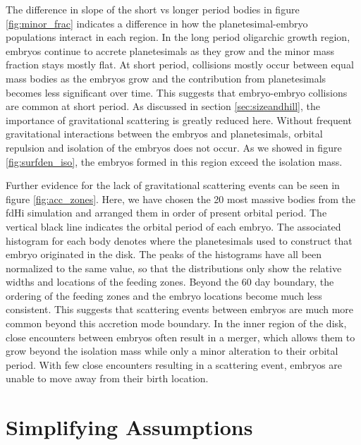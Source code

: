 \documentclass[twocolumn]{aastex63}
\begin{document}
The difference in slope of the short vs longer period bodies in figure \ref{fig:minor_frac} indicates a difference in how the planetesimal-embryo populations interact in each region. In the long period oligarchic growth region, embryos continue to accrete planetesimals as they grow and the minor mass fraction stays mostly flat. At short period, collisions mostly occur between equal mass bodies as the embryos grow and the contribution from planetesimals becomes less significant over time. This suggests that embryo-embryo collisions are common at short period. As discussed in section \ref{sec:sizeandhill}, the importance of gravitational scattering is greatly reduced here. Without frequent gravitational interactions between the embryos and planetesimals, orbital repulsion \citep{kokubo98} and isolation of the embryos does not occur. As we showed in figure \ref{fig:surfden_iso}, the embryos formed in this region exceed the isolation mass.

Further evidence for the lack of gravitational scattering events can be seen in figure \ref{fig:acc_zones}. Here, we have chosen the 20 most massive bodies from the fdHi simulation and arranged them in order of present orbital period. The vertical black line indicates the orbital period of each embryo. The associated histogram for each body denotes where the planetesimals used to construct that embryo originated in the disk. The peaks of the histograms have all been normalized to the same value, so that the distributions only show the relative widths and locations of the feeding zones. Beyond the 60 day boundary, the ordering of the feeding zones and the embryo locations become much less consistent. This suggests that scattering events between embryos are much more common beyond this accretion mode boundary. In the inner region of the disk, close encounters between embryos often result in a merger, which allows them to grow beyond the isolation mass while only a minor alteration to their orbital period. With few close encounters resulting in a scattering event, embryos are unable to move away from their birth location.


\section{Simplifying Assumptions}\label{sec:assump}
\end{document}
